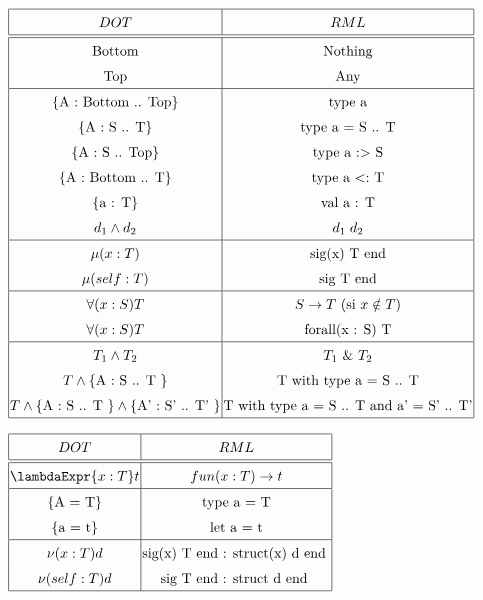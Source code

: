 \begin{center}
$\arraycolsep=1.0pt\def\arraystretch{1.5}
\begin{array}{|c|c|}
  \hline
  DOT & RML \\
  \hline \hline
  \text{Bottom} & \text{Nothing} \\
  \text{Top} & \text{Any} \\
  \hline
  \left\{ \text{A : Bottom .. Top} \right\} & \text{type a} \\
  \left\{ \text{A : S .. T} \right\} & \text{type a = S  .. T} \\
  \left\{ \text{A : S .. Top} \right\} & \text{type a $:>$ S} \\
  \left\{ \text{A : Bottom .. T} \right\} & \text{type a $<:$ T} \\
  \left\{ \text{a : T} \right\} & \text{val a : T} \\
  d_{1} \wedge d_{2} & d_{1} \; d_{2} \\
  \hline
  \mu(x : T) & \text{sig(x) T end} \\
  \mu(self : T) & \text{sig T end} \\
  \hline
  \forall(x : S) T & S \rightarrow T \text{ (si $x \notin T$)}\\
  \forall(x : S) T & \text{forall(x : S) T} \\
  \hline
  T_{1} \wedge T_{2} & T_{1} \text{ \& } T_{2} \\
  T \wedge \left\{ \text{A : S .. T } \right\} & \text{T with type a = S .. T} \\
  T \wedge \left\{ \text{A : S .. T } \right\} \wedge \left\{ \text{A' : S' ..
  T' } \right\} & \text{T with type a = S .. T and a' = S' .. T'} \\
  \hline
\end{array}
$
\end{center}

\begin{center}
$\arraycolsep=1.0pt\def\arraystretch{1.5}
\begin{array}{|c|c|}
  \hline
  DOT & RML \\
  \hline \hline
  \lambdaExpr{x : T} t & fun(x : T) \rightarrow t \\
  \hline
  \left\{ \text{A = T} \right\} & \text{type a = T} \\
  \left\{ \text{a = t} \right\} & \text{let a = t} \\
  \hline
  \nu(x : T) d & \text{sig(x) T end : struct(x) d end } \\
  \nu(self : T) d & \text{sig T end : struct d end } \\
  \hline
\end{array}
$
\end{center}

